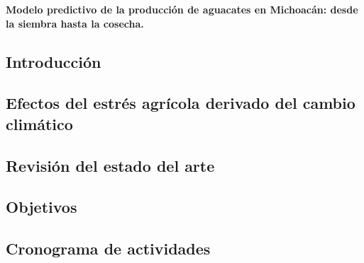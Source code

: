 \documentclass[12pt,oneside,article]{memoir}
\begin{document}
\thispagestyle{firstpagestyle}
\textbf{Modelo predictivo de la producción de aguacates en Michoacán: desde la siembra hasta la cosecha.}

\subsection*{Introducción}


\subsection{Efectos del estrés agrícola derivado del cambio climático}


\subsection{Revisión del estado del arte}


\subsection{Objetivos}


\subsection{Cronograma de actividades}


%


\end{document}
